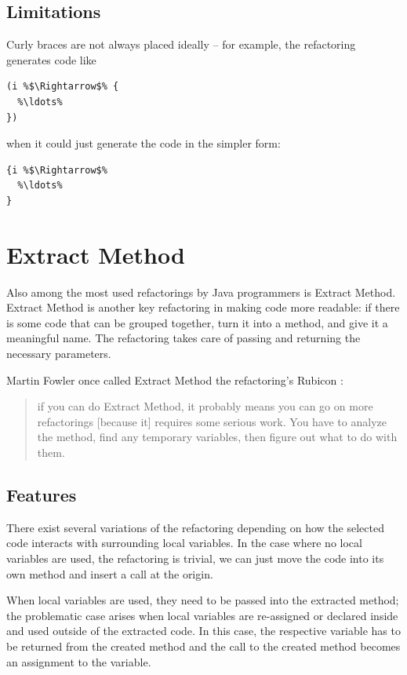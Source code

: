 \documentclass[10pt,a4paper,oneside]{scrreprt}
\begin{document}
\subsection{Limitations}

Curly braces are not always placed ideally -- for example, the refactoring generates code like 

\begin{lstlisting}
(i %$\Rightarrow$% {
  %\ldots%
})
\end{lstlisting}

when it could just generate the code in the simpler form:

\begin{lstlisting}
{i %$\Rightarrow$%
  %\ldots%
}
\end{lstlisting}

\section{Extract Method}

Also among the most used refactorings by Java programmers is Extract Method. Extract Method is another key refactoring in making code more readable: if there is some code that can be grouped together, turn it into a method, and give it a meaningful name. The refactoring takes care of passing and returning the necessary parameters.

Martin Fowler once called Extract Method the refactoring's Rubicon \cite{FowlerRubicon}: 

\begin{quotation}
if you can do Extract Method, it probably means you can go on more refactorings [because it] requires some serious work. You have to analyze the method, find any temporary variables, then figure out what to do with them.
\end{quotation} 

\subsection{Features}

There exist several variations of the refactoring depending on how the selected code interacts with surrounding local variables. In the case where no local variables are used, the refactoring is trivial, we can just move the code into its own method and insert a call at the origin. 

When local variables are used, they need to be passed into the extracted method; the problematic case arises when local variables are re-assigned or declared inside and used outside of the extracted code. In this case, the respective variable has to be returned from the created method and the call to the created method becomes an assignment to the variable. 
\end{document}
